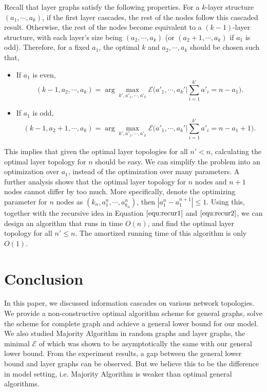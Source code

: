 \documentclass[a4paper,UKenglish]{lipics}
\theoremstyle{definition}
\begin{document}
Recall that layer graphs satisfy the following properties.
For a $k$-layer structure $(a_1, \dotsb, a_k)$,
	if the first layer cascades, the rest of the nodes follow this cascaded result.
Otherwise, the rest of the nodes become equivalent to a $(k-1)$-layer structure, with each layer's size being $(a_2,\dotsb,a_k)$ (or $(a_2+1,\dotsb,a_k)$ if $a_1$ is odd).
Therefore, for a fixed $a_1$, the optimal $k$ and $a_2, \dotsb, a_k$ should be chosen such that,
\begin{itemize} 
\item If $a_1$ is even,
\begin{equation}
\label{equ:recur1}
	(k-1, a_2, \dotsb, a_k) 
= 
	\arg\max_{k', a'_1, \dotsb, a'_k}
		\mathcal{E}\Big(
			a'_1, \dotsb, a_k' \Big| \sum_{i=1}^{k'} a'_i = n - a_1
		\Big).
\end{equation}
\item If $a_1$ is odd,
\begin{equation}
\label{equ:recur2}
	(k-1, a_2 + 1, \dotsb, a_k)
=
	\arg\max_{k', a'_1, \dotsb, a'_k}
		\mathcal{E}\Big(
			a'_1, \dotsb, a_k' \Big| \sum_{i=1}^{k'} a'_i = n - a_1+ 1 
		\Big).
\end{equation}
\end{itemize}
This implies that given the optimal layer topologies for all $n' < n$, calculating the optimal layer topology for $n$ should be easy. 
We can simplify the problem into an optimization over $a_1$, instead of the optimization over many parameters. 
A further analysis shows that the optimal layer topology for $n$ nodes and $n+1$ nodes cannot differ by too much. 
More specifically, denote the optimizing parameter for $n$ nodes as $(k_n, a^n_1, \dotsb, a^n_{k_n})$, then $|a^n_1 - a^{n+1}_1| \le 1$.
Using this, together with the recursive idea in Equation $\ref{equ:recur1}$ and $\ref{equ:recur2}$, 	
	we can design an algorithm that runs in time $O(n)$, and find the optimal layer topology for all $n' \le n$. 
The amortized running time of this algorithm is only $O(1)$.









\section{Conclusion}

In this paper, we discussed information cascades on various network topologies. 
We provide a non-constructive optimal algorithm scheme for general graphs, solve the scheme for complete graph and achieve a general lower bound for our model.
We also studied Majority Algorithm in random graphs and layer graphs, the minimal $\mathcal{E}$ of which was shown to be asymptotically the same with our general lower bound. 
From the experiment results, a gap between the general lower bound and layer graphs can be observed. 
But we believe this to be the difference in model setting, i.e. Majority Algorithm is weaker than optimal general algorithms. 
\end{document}
